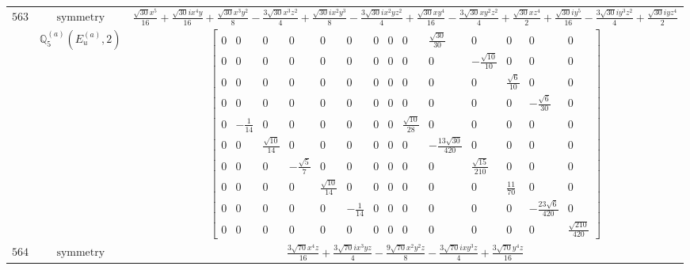 \documentclass[fleqn,8pt,landscape]{jsarticle}
\begin{document}
\begin{longtable}{ccc}
$ 563 $ & $ \text{symmetry} $ & $ \frac{\sqrt{30} x^{5}}{16} + \frac{\sqrt{30} i x^{4} y}{16} + \frac{\sqrt{30} x^{3} y^{2}}{8} - \frac{3 \sqrt{30} x^{3} z^{2}}{4} + \frac{\sqrt{30} i x^{2} y^{3}}{8} - \frac{3 \sqrt{30} i x^{2} y z^{2}}{4} + \frac{\sqrt{30} x y^{4}}{16} - \frac{3 \sqrt{30} x y^{2} z^{2}}{4} + \frac{\sqrt{30} x z^{4}}{2} + \frac{\sqrt{30} i y^{5}}{16} - \frac{3 \sqrt{30} i y^{3} z^{2}}{4} + \frac{\sqrt{30} i y z^{4}}{2} $ \\
$  $ & $ \mathbb{Q}_{5}^{(a)}(E_{u}^{(a)},2) $ & $ \begin{bmatrix} 0 & 0 & 0 & 0 & 0 & 0 & 0 & 0 & 0 & \frac{\sqrt{30}}{30} & 0 & 0 & 0 & 0 \\ 0 & 0 & 0 & 0 & 0 & 0 & 0 & 0 & 0 & 0 & - \frac{\sqrt{10}}{10} & 0 & 0 & 0 \\ 0 & 0 & 0 & 0 & 0 & 0 & 0 & 0 & 0 & 0 & 0 & \frac{\sqrt{6}}{10} & 0 & 0 \\ 0 & 0 & 0 & 0 & 0 & 0 & 0 & 0 & 0 & 0 & 0 & 0 & - \frac{\sqrt{6}}{30} & 0 \\ 0 & - \frac{1}{14} & 0 & 0 & 0 & 0 & 0 & 0 & \frac{\sqrt{10}}{28} & 0 & 0 & 0 & 0 & 0 \\ 0 & 0 & \frac{\sqrt{10}}{14} & 0 & 0 & 0 & 0 & 0 & 0 & - \frac{13 \sqrt{30}}{420} & 0 & 0 & 0 & 0 \\ 0 & 0 & 0 & - \frac{\sqrt{5}}{7} & 0 & 0 & 0 & 0 & 0 & 0 & \frac{\sqrt{15}}{210} & 0 & 0 & 0 \\ 0 & 0 & 0 & 0 & \frac{\sqrt{10}}{14} & 0 & 0 & 0 & 0 & 0 & 0 & \frac{11}{70} & 0 & 0 \\ 0 & 0 & 0 & 0 & 0 & - \frac{1}{14} & 0 & 0 & 0 & 0 & 0 & 0 & - \frac{23 \sqrt{6}}{420} & 0 \\ 0 & 0 & 0 & 0 & 0 & 0 & 0 & 0 & 0 & 0 & 0 & 0 & 0 & \frac{\sqrt{210}}{420} \end{bmatrix} $ \\ \hline
$ 564 $ & $ \text{symmetry} $ & $ \frac{3 \sqrt{70} x^{4} z}{16} + \frac{3 \sqrt{70} i x^{3} y z}{4} - \frac{9 \sqrt{70} x^{2} y^{2} z}{8} - \frac{3 \sqrt{70} i x y^{3} z}{4} + \frac{3 \sqrt{70} y^{4} z}{16} $ \\

\end{longtable}
\end{document}
